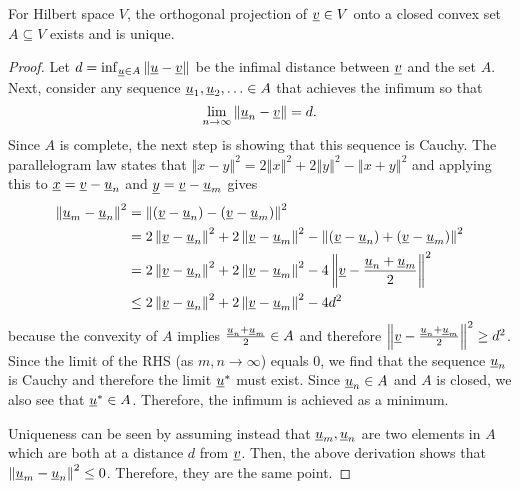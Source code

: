 \begin{theorem}
\label{theorem:HilbertProjectionTheorem} For Hilbert space $V$, the orthogonal projection of $\underline v \in V$ onto a closed convex set $A\subseteq V$ exists and is unique.
\end{theorem}
\begin{proof}

Let $d=\inf_{\underline u\in A}\left\Vert \underline u-\underline v\right\Vert$ be the infimal distance between $\underline v$ and the set $A$.
Next, consider any sequence $\underline u_{1},\underline u_{2},\ldots\in A$ that achieves the infimum so that
\[
\lim_{n\rightarrow\infty}\left\Vert \underline u_{n}-\underline v\right\Vert =d.
\]
Since $A$ is complete, the next step is showing that this sequence is Cauchy. The parallelogram law states that $\left\Vert x-y\right\Vert ^{2}=2\left\Vert x\right\Vert ^{2}+2\left\Vert y\right\Vert ^{2}-\left\Vert x+y\right\Vert ^{2}$ and applying this to $\underline{x}=\underline{v}-\underline u_{n}$ and $\underline{y}=\underline{v}-\underline u_{m}$ gives
\begin{align*}
\left\Vert \underline u_{m}-\underline u_{n}\right\Vert ^{2} & =\left\Vert \left(\underline v-\underline u_{n}\right)-\left(\underline v-\underline u_{m}\right)\right\Vert ^{2}\\
 & =2\left\Vert \underline v-\underline u_{n}\right\Vert ^{2}+2\left\Vert \underline v-\underline u_{m}\right\Vert ^{2}-\left\Vert \left(\underline v-\underline u_{n}\right)+\left(\underline v-\underline u_{m}\right)\right\Vert ^{2}\\
 & =2\left\Vert \underline v-\underline u_{n}\right\Vert ^{2}+2\left\Vert \underline v-\underline u_{m}\right\Vert ^{2}-4\left\Vert \underline v-\frac{\underline u_{n}+\underline u_{m}}{2}\right\Vert ^{2}\\
 & \leq2\left\Vert \underline v-\underline u_{n}\right\Vert ^{2}+2\left\Vert \underline v-\underline u_{m}\right\Vert ^{2}-4d^{2}
\end{align*}
because the convexity of $A$ implies $\frac{\underline u_{n}+\underline u_{m}}{2}\in A$ and therefore $\left\Vert \underline v-\frac{\underline u_{n}+\underline u_{m}}{2}\right\Vert ^{2}\geq d^{2}$. Since the limit of the RHS (as $m,n\rightarrow\infty$) equals $0$, we find that the sequence $\underline u_{n}$ is Cauchy and therefore the limit $\underline u^{*}$ must exist. Since $\underline u_{n}\in A$ and $A$ is closed, we also see that $\underline u^{*}\in A$. Therefore, the infimum is achieved as a minimum.

Uniqueness can be seen by assuming instead that $\underline u_{m},\underline u_{n}$ are two elements in $A$ which are both at a distance $d$ from $\underline v$. Then, the above derivation shows that $\left\Vert \underline u_{m}-\underline u_{n}\right\Vert ^{2}\leq0$. Therefore, they are the same point.
\end{proof}

